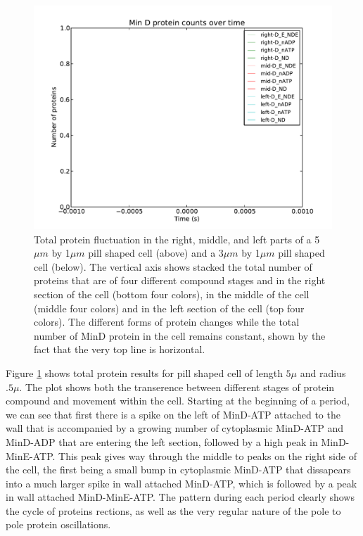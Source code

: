 \documentclass[letterpaper,twocolumn,amsmath,amssymb,pre]{revtex4-1}
\begin{document}
\begin{figure}
  \includegraphics[width=\columnwidth]{../data/shape-p/plots/box-plot_D--p-200-50-0-0-1500}
  \caption{Total protein fluctuation in the right, middle, and left
    parts of a 5$\mu m$ by 1$\mu m$ pill shaped cell (above) and a
    3$\mu m$ by 1$\mu m$ pill shaped cell (below).  The vertical axis shows
    stacked the total number of proteins that are of four different
    compound stages and in the right section of the cell (bottom four
    colors), in the middle of the cell (middle four colors) and in the
    left section of the cell (top four colors). The different forms of
    protein changes while the total number of MinD protein in the cell
    remains constant, shown by the fact that the very top line is
    horizontal.}
  \label{total-oscillation-plot}
\end{figure}

Figure \ref{total-oscillation-plot} shows total protein
results for pill shaped cell of length $5\mu$ and radius $.5\mu$.  The
plot shows both the transerence between different stages of protein
compound and movement within the cell.  Starting at the beginning of a
period, we can see that first there is a spike on the left of MinD-ATP
attached to the wall that is accompanied by a growing number of
cytoplasmic MinD-ATP and MinD-ADP that are entering the left section,
followed by a high peak in MinD-MinE-ATP.  This peak gives way through
the middle to peaks on the right side of the cell, the first being a
small bump in cytoplasmic MinD-ATP that dissapears into a much larger
spike in wall attached MinD-ATP, which is followed by a peak in wall
attached MinD-MinE-ATP.  The pattern during each period clearly shows
the cycle of proteins rections, as well as the very regular nature of
the pole to pole protein oscillations.
\end{document}
